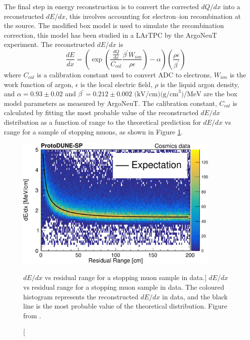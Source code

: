 The final step in energy reconstruction is to convert the corrected $dQ/dx$ into
a reconstructed $dE/dx$, this involves accounting for electron--ion
recombination at the source. The modified box model is used to simulate the
recombination correction, this model has been studied in a LArTPC by the 
ArgoNeuT experiment\cite{Acciarri2013a}. The reconstructed $dE/dx$ is 
\begin{equation*}
	\frac{dE}{dx} = \left( \exp \left( \frac{\frac{dQ}{dx}}{C_{cal}} \frac{\beta^\prime
	W_{ion}}{\rho \epsilon} \right) - \alpha \right)
	\left( \frac{\rho \epsilon}{\beta^\prime} \right)
\end{equation*}
where $C_{cal}$ is a calibration constant used to convert ADC to electrons,
$W_{ion}$ is the work function of argon, $\epsilon$ is the local electric field,
$\rho$ is the liquid argon density, and \(\alpha = 0.93 \pm 0.02\) and 
\(\beta^\prime = 0.212 \pm 0.002 \mbox{ (kV/cm)(g/cm}^3) / \mbox{MeV}\) are the box model 
parameters as measured by ArgoNeuT\cite{Acciarri2013a}. The calibration 
constant, $C_{cal}$ is calculated by fitting the most probable value of the 
reconstructed $dE/dx$ distribution as a function of range to the theoretical 
prediction for $dE/dx$ vs range for a sample of stopping muons, as shown in 
Figure \ref{fig:dedx_v_rr}.

\begin{figure}

	\centering

	\includegraphics[width=0.9\textwidth]{figures/dedx_v_rr.pdf}

	\caption
	[$dE/dx$ vs residual range for a stopping muon sample in \protodune{} data.]
	{$dE/dx$ vs residual range for a stopping muon sample in \protodune{} data.
	The coloured histogram represents the reconstructed $dE/dx$ in \protodune{}
	data, and the black line is the most probable value of the theoretical 
	distribution. Figure from \cite{protoduneperf}.}

	\label{fig:dedx_v_rr}

\end{figure}

